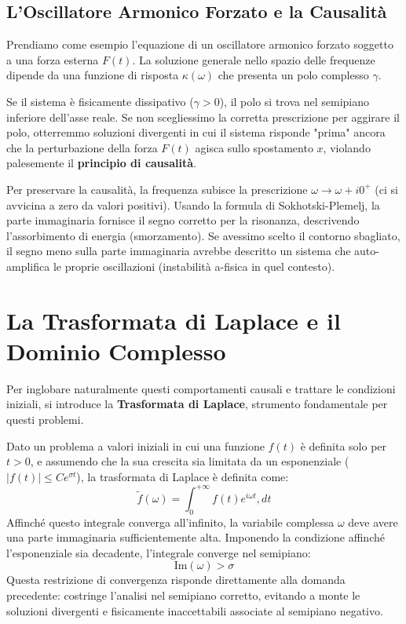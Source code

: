 \subsection{L'Oscillatore Armonico Forzato e la Causalità}
Prendiamo come esempio l'equazione di un oscillatore armonico forzato soggetto a una forza esterna $F(t)$. La soluzione generale nello spazio delle frequenze dipende da una funzione di risposta $\kappa(\omega)$ che presenta un polo complesso $\gamma$.

Se il sistema è fisicamente dissipativo ($\gamma > 0$), il polo si trova nel semipiano inferiore dell'asse reale. Se non scegliessimo la corretta prescrizione per aggirare il polo, otterremmo soluzioni divergenti in cui il sistema risponde "prima" ancora che la perturbazione della forza $F(t)$ agisca sullo spostamento $x$, violando palesemente il \textbf{principio di causalità}.

Per preservare la causalità, la frequenza subisce la prescrizione $\omega \to \omega + i0^+$ (ci si avvicina a zero da valori positivi). Usando la formula di Sokhotski-Plemelj, la parte immaginaria fornisce il segno corretto per la risonanza, descrivendo l'assorbimento di energia (smorzamento). Se avessimo scelto il contorno sbagliato, il segno meno sulla parte immaginaria avrebbe descritto un sistema che auto-amplifica le proprie oscillazioni (instabilità a-fisica in quel contesto).

\section{La Trasformata di Laplace e il Dominio Complesso}

Per inglobare naturalmente questi comportamenti causali e trattare le condizioni iniziali, si introduce la \textbf{Trasformata di Laplace}, strumento fondamentale per questi problemi.

Dato un problema a valori iniziali in cui una funzione $f(t)$ è definita solo per $t > 0$, e assumendo che la sua crescita sia limitata da un esponenziale ($\vert{}f(t)\vert{} \le C e^{\sigma t}$), la trasformata di Laplace è definita come:
\begin{equation}
\tilde{f}(\omega) = \int_0^{+\infty} f(t) e^{i\omega t} , dt
\end{equation}
Affinché questo integrale converga all'infinito, la variabile complessa $\omega$ deve avere una parte immaginaria sufficientemente alta. Imponendo la condizione affinché l'esponenziale sia decadente, l'integrale converge nel semipiano:
\begin{equation}
\text{Im}(\omega) > \sigma
\end{equation}
Questa restrizione di convergenza risponde direttamente alla domanda precedente: costringe l'analisi nel semipiano corretto, evitando a monte le soluzioni divergenti e fisicamente inaccettabili associate al semipiano negativo.

